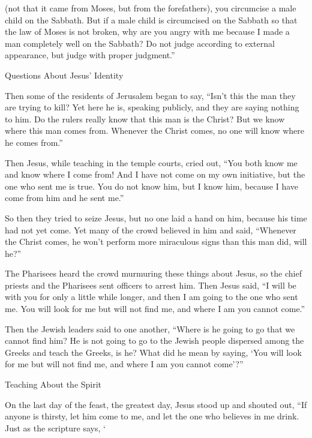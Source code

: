 {(not
that
it came
from
Moses,
but
from
the forefathers), you circumcise
a male child
on
the Sabbath.
But if
a male child
is circumcised
on
the Sabbath
so that
the law
of Moses
is
not
broken,
why are you angry
with me
because
I made
a man
completely
well
on
the Sabbath?
Do
not
judge
according
to external appearance,
but
judge
with proper
judgment.”
\par }{\SH Questions About Jesus’ Identity
\par }{\PP {}Then
some
of
the residents of Jerusalem
began to say,
“Isn’t
this
the man
they are trying
to kill?
Yet
here he is, speaking
publicly,
and
they are saying
nothing
to him.
Do the rulers
really
know
that
this man
is
the Christ?
But
we know
where
this man
comes
from. Whenever
the Christ
comes,
no one
will know
where
he comes from.”
\par }{\PP {}Then
Jesus,
while teaching
in
the temple courts,
cried out, “You
both know
me
and
know
where
I come from! And
I have
not
come
on
my own initiative,
but
the one who sent
me
is
true.
You
do
not
know him,
but I
know
him,
because
I have come
from
him
and he
sent
me.”
\par }{\PP {}So then
they tried
to seize
Jesus,
but
no one
laid
a hand
on
him,
because
his
time
had
not yet
come.
Yet
many
of
the crowd
believed
in
him
and
said,
“Whenever
the Christ
comes,
he
won’t
perform
more
miraculous signs
than
this man
did, will he?”
\par }{\PP {}The Pharisees
heard
the crowd
murmuring
these things
about
Jesus,
so the chief priests
and
the Pharisees
sent
officers
to
arrest
him.
Then
Jesus
said,
“I will be with
you
for only a
little
while
longer,
and then
I am going
to
the one who sent
me.
You will look for
me
but
will
not
find
me,
and
where
I
am
you
cannot
come.”
\par }{\PP {}Then
the Jewish leaders
said
to
one another,
“Where
is
he
going
to go
that
we
cannot
find
him? He is
not
going
to go
to the Jewish people dispersed
among the Greeks
and
teach
the Greeks, is he?
What
did he
mean
by saying, ‘You will look for
me
but
will
not
find
me,
and
where
I
am
you
cannot
come’?”
\par }{\SH Teaching About the Spirit
\par }{\PP {}On
the last
day
of the feast,
the greatest
day, Jesus
stood up
and
shouted out, “If
anyone
is thirsty,
let him come
to
me,
and
let the one who believes
in
me
drink. Just
as the scripture
says, ‘{}}
